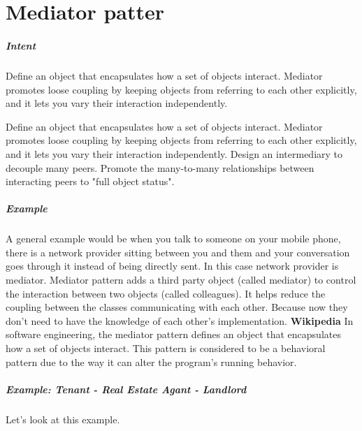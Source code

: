 \documentclass{book}
\begin{document}
\chapter{Mediator patter}\label{MediatorPattern}
\paragraph{Intent}
Define an object that encapsulates how a set of objects interact.
Mediator promotes loose coupling by keeping objects from referring to each other explicitly, and it lets you vary their interaction independently.

Define an object that encapsulates how a set of objects interact. 
Mediator promotes loose coupling by keeping objects from referring to each other explicitly, and it lets you vary their interaction independently.
Design an intermediary to decouple many peers.
Promote the many-to-many relationships between interacting peers to "full object status".
\paragraph{Example} A general example would be when you talk to someone on your mobile phone,
there is a network provider sitting between you and them and your conversation goes through it instead of being directly sent. In this case network provider is mediator.
Mediator pattern adds a third party object (called mediator) to control the interaction between two objects (called colleagues).
It helps reduce the coupling between the classes communicating with each other. Because now they don't need to have the knowledge of each other's implementation.
\textbf{Wikipedia} In software engineering, the mediator pattern defines an object that encapsulates how a set of objects interact.
This pattern is considered to be a behavioral pattern due to the way it can alter the program's running behavior.
\paragraph{Example: Tenant - Real Estate Agant - Landlord}
Let's look at this example.
\begin{figure}[H]
\begin{floatrow}
\end{floatrow}
\end{figure}
\end{document}
